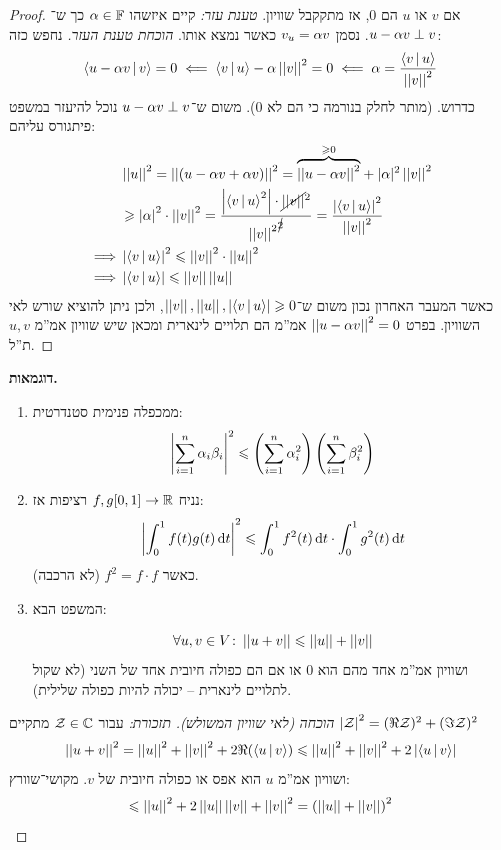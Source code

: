 \documentclass[name=רשימות אלגברה לינארית 2א]{../../../tex/classes/megasumPreamble}
\begin{document}
	\begin{proof}
		אם $v$ או $u$ הם $0$, אז מתקקבל שוויון. 
		\textit{טענת עזר: }קיים איזשהו $\ag \in \F$ כך ש־$u - \ag v \perp v$. נסמן $v_u = \ag v$ כאשר נמצא אותו. 
		\textit{הוכחת טענת העזר. }נחפש כזה: 
		\[ \mut{u - \ag v}{v} = 0 \impliedby \mut{v}{u} - \ag \norm{v}^2 = 0 \impliedby \ag = \frac{\mut{v}{u}}{\norm{v}^2} \]
		כדרוש. (מותר לחלק בנורמה כי הם לא $0$). משום ש־$u - \ag v \perp v$ נוכל להיעזר במשפט פיתגורס עליהם: 
		\begin{align*}
			 &\norm{u}^2 = \norm{(u - \ag v + \ag v)}^2 = {\overbrace{\norm{u - \ag v}^2}^{\ge 0}} + |\ag|^2\norm{v}^2 \\ 
				&\ge \sof{\ag}^2\cdot\norm{v}^2 = \frac{\sof{\mut{v}{u}^2}\cdot \cancel{\norm v}^2}{{\norm{v}^2}^{\cancel{2}}} =\frac{\sof{\mut{v}{u}}^2}{\norm v^2} \\
			\implies &\sof{\mut{v}{u}}^2 \le \norm{v}^2 \cdot \norm{u}^2 \\
			\implies &\sof{\mut{v}{u}} \le \norm v \norm u
		\end{align*}
		כאשר המעבר האחרון נכון משום ש־$\norm v, \norm u, \sof{\mut{v}{u}} \ge 0$, ולכן ניתן להוציא שורש לאי השוויון. 
		בפרט $\norm{u - \ag v}^2 = 0$ אמ''מ הם תלויים לינארית ומכאן שיש שוויון אמ''מ $u, v$ ת''ל. 
	\end{proof}
	
	
	
	\textbf{דוגמאות. }
	\begin{enumerate}
		\item ממכפלה פנימית סטנדרטית: 
		\[ \sof{\sum_{i = 1}^{n}\ag_i \bg_i}^2 \le \cl{\sum_{i = 1}^{n}\ag_i^2} \cl{\sum_{i = 1}^{n}\bg_i^2} \]
		\item  נניח $f, g [0, 1] \to \R$ רציפות אז: 
		\[ \sof{\int^1_0 f(t)g(t) \dt}^2 \le \int_{0}^{1}f^2(t) \dt \cdot\int^1_0 g^2(t) \dt \]
		כאשר $f^2 = f \cdot f$ (לא הרכבה). 
		\item המשפט הבא: \begin{Theorem}
			\[ \forall u, v \in V \co \norm{u + v} \le \norm{u} + \norm{v} \]
			ושוויון אמ''מ אחד מהם הוא $0$ או אם הם כפולה חיובית אחד של השני (לא שקול לתלויים לינארית – יכולה להיות כפולה שלילית). 
		\end{Theorem}
	\end{enumerate}
	\begin{proof}[הוכחה (לאי שוויון המשולש)]
		\textit{תזכורת:} עבור $\zc \in \C$ מתקיים $\sof{\zc}^2 = (\Re \zc)^2 + (\Im \zc)^2$
		\[ \norm{u + v}^2 = \norm{u}^2 + \norm{v}^2 + 2\Re(\mut{u}{v}) \le \norm{u}^2 + \norm{v}^2 + 2\sof{\mut{u}{v}}  \]
		ושוויון אמ''מ $u$ הוא אפס או כפולה חיובית של $v$. מקושי־שוורץ: 
		\[ \le \norm{u}^2 + 2\norm{u}\norm{v} + \norm{v}^2 = \cl{\norm{u} + \norm{v}}^2 \]\mathenvendproof
	\end{proof}
	
\end{document}
